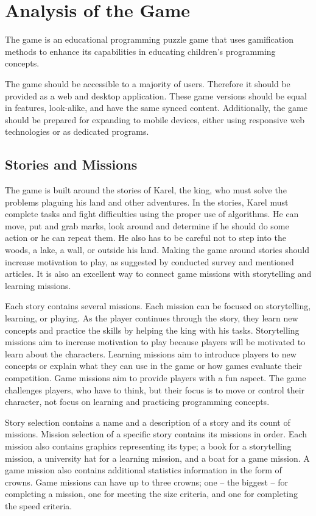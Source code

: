 \section{Analysis of the Game}
\label{analysis:game}

The game \emph{\myAppName} is an educational programming puzzle game that uses gamification methods to enhance its capabilities in educating children's programming concepts.

The game should be accessible to a majority of users.
Therefore it should be provided as a web and desktop application.
These game versions should be equal in features, look-alike, and have the same synced content.
Additionally, the game should be prepared for expanding to mobile devices, either using responsive web technologies or as dedicated programs.

\subsection{Stories and Missions}
\label{analysis:game:stories-and-missions}

The game is built around the stories of Karel, the king, who must solve the problems plaguing his land and other adventures.
In the stories, Karel must complete tasks and fight difficulties using the proper use of algorithms.
He can move, put and grab marks, look around and determine if he should do some action or he can repeat them.
He also has to be careful not to step into the woods, a lake, a wall, or outside his land.
Making the game around stories should increase motivation to play, as suggested by conducted survey and mentioned articles.
It is also an excellent way to connect game missions with storytelling and learning missions.

Each story contains several missions.
Each mission can be focused on storytelling, learning, or playing.
As the player continues through the story,
they learn new concepts and practice the skills by helping the king with his tasks.
Storytelling missions aim to increase motivation to play because players will be motivated to learn about the characters.
Learning missions aim to introduce players to new concepts or explain what they can use in the game or how games evaluate their competition.
Game missions aim to provide players with a fun aspect.
The game challenges players, who have to think, but their focus is to move or control their character, not focus on learning and practicing programming concepts.

Story selection contains a name and a description of a story and its count of missions.
Mission selection of a specific story contains its missions in order.
Each mission also contains graphics representing its type; a book for a storytelling mission, a university hat for a learning mission, and a boat for a game mission.
A game mission also contains additional statistics information in the form of crowns.
Game missions can have up to three crowns; one -- the biggest -- for completing a mission, one for meeting the size criteria, and one for completing the speed criteria.

